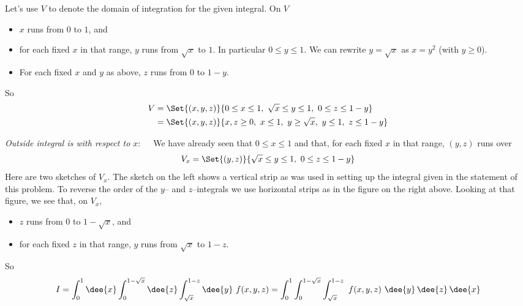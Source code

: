 \begin{solution}
Let's use $V$ to denote the domain of integration for the given integral.
On $V$
\begin{itemize}
\item 
$x$ runs from $0$ to $1$, and
\item 
for each fixed $x$ in that range, $y$ runs from $\sqrt{x}$ to $1$.
In particular $0\le y\le 1$.
We can rewrite $y=\sqrt{x}$ as $x=y^2$ (with $y\ge 0$).
\item
For each fixed $x$ and $y$ as above, $z$ runs from $0$ to $1-y$.
\end{itemize}
So
\begin{align*}
V &= \Set{(x,y,z)}{0\le x\le 1,\ \sqrt{x}\le y\le 1,\ 0\le z\le 1-y} \\
  &=  \Set{(x,y,z)}{x,z\ge 0,\ x\le 1,\ y\ge \sqrt{x},\ y\le 1,\ z\le 1-y}
\end{align*}


\emph{Outside integral is with respect to $x$}:\ \ \ 
We have already seen that $0\le x\le 1$ and that, for each fixed $x$ in 
that range, $(y,z)$ runs over
\begin{equation*}
V_x =\Set{(y,z)}{\sqrt{x}\le y\le 1,\ 0\le z\le 1-y}
\end{equation*}
Here are two sketches of $V_x$. The sketch on the left shows
a vertical strip as was used in setting up the integral given in the statement
of this problem.
To reverse the order of the $y$-- and $z$--integrals we use 
horizontal strips as in the figure on the right above.
Looking at that figure, we see that, on $V_x$,
\begin{itemize}
\item
$z$ runs from $0$ to $1-\sqrt{x}$, and
\item
for each fixed $z$ in that range, $y$ runs from $\sqrt{x}$ to $1-z$.
\end{itemize}
So
\begin{align*}
I = \int_0^1\dee{x} \int_0^{1-\sqrt{x}}\dee{z} \int_{\sqrt{x}}^{1-z}\dee{y}
                \ f(x,y,z)
= \int_0^1 \int_0^{1-\sqrt{x}} \int_{\sqrt{x}}^{1-z}
                \ f(x,y,z)\  \dee{y}\,\dee{z}\,\dee{x}
\end{align*}


\end{solution}
